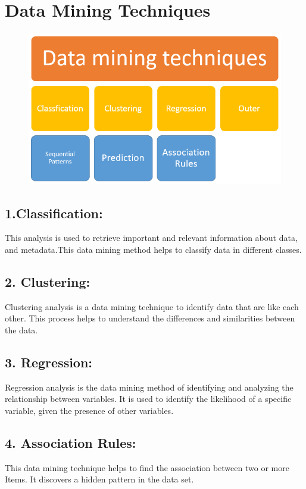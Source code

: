 \documentclass[a4paper,10pt]{article}
\begin{document}
\section{Data Mining Techniques}

\begin{figure}[H]
           \centering
           \includegraphics[width=\linewidth]{figure2.png}

\end{figure}

\subsection*{1.Classification:}
This analysis is used to retrieve important and relevant information about data, and metadata.This data mining method helps to classify data in different classes.

\subsection*{2. Clustering:}
Clustering analysis is a data mining technique to identify data that are like each other. This process helps to understand the differences and similarities between the data.

\subsection*{3. Regression:}
Regression analysis is the data mining method of identifying and analyzing the relationship between variables. It is used to identify the likelihood of a specific variable, given the presence of other variables.

\subsection*{4. Association Rules:}
This data mining technique helps to find the association between two or more Items. It discovers a hidden pattern in the data set.
\end{document}
